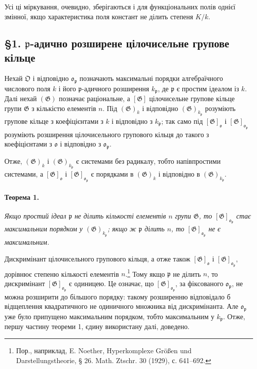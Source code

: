\documentclass[11pt]{article}
\providecommand{\frakO}{\mathfrak{O}}
\providecommand{\frako}{\mathfrak{o}}
\providecommand{\frakp}{\mathfrak{p}}
\providecommand{\Gg}{\mathfrak{G}}
\begin{document}
Усі ці міркування, очевидно, зберігаються і для функціональних полів однієї змінної, якщо характеристика поля констант не ділить степеня \(K/k\).

\subsection*{§1. \(\frakp\)-адично розширене цілочисельне групове кільце}

Нехай \(\frakO\) і відповідно \(\frako_\frakp\) позначають максимальні порядки алгебраїчного числового поля \(k\) і його \(\frakp\)-адичного розширення \(k_\frakp\), де \(\frakp\) є простим ідеалом із \(k\). Далі нехай \((\Gg)\) позначає раціональне, а \([\Gg]\) цілочисельне групове кільце групи \(\Gg\) з кількістю елементів \(n\). Під \((\Gg)_k\) і відповідно \((\Gg)_{k_\frakp}\) розуміють групове кільце з коефіцієнтами з \(k\) і відповідно з \(k_\frakp\); так само під \([\Gg]_\frako\) і \([\Gg]_{\frako_\frakp}\) розуміють розширення цілочисельного групового кільця до такого з коефіцієнтами з \(\frako\) і відповідно з \(\frako_\frakp\).

Отже, \((\Gg)_k\) і \((\Gg)_{k_\frakp}\) є системами без радикалу, тобто напівпростими системами, а \([\Gg]_\frako\) і \([\Gg]_{\frako_\frakp}\) є порядками в \((\Gg)_k\) і відповідно в \((\Gg)_{k_\frakp}\).

\paragraph{Теорема 1.}
\emph{Якщо простий ідеал \(\frakp\) не ділить кількості елементів \(n\) групи \(\Gg\), то \([\Gg]_{\frako_\frakp}\) стає максимальним порядком у \((\Gg)_{k_\frakp}\); якщо ж \(\frakp\) ділить \(n\), то \([\Gg]_{\frako_\frakp}\) не є максимальним.}

Дискримінант цілочисельного групового кільця, а отже також \([\Gg]_\frako\) і \([\Gg]_{\frako_\frakp}\), дорівнює степеню кількості елементів \(n\).\footnote{Пор., наприклад, E. Noether, Hyperkomplexe Größen und Darstellungstheorie, § 26. Math. Ztschr. 30 (1929), с. 641--692.} Тому якщо \(\frakp\) не ділить \(n\), то дискримінант \([\Gg]_{\frako_\frakp}\) є одиницею. Це означає, що \([\Gg]_{\frako_\frakp}\), за фіксованого \(\frako_\frakp\), не можна розширити до більшого порядку: такому розширенню відповідало б відщеплення квадратичного не одиничного множника від дискримінанта. Але \(\frako_\frakp\) уже було припущено максимальним порядком, тобто максимальним у \(k_\frakp\). Отже, першу частину теореми 1, єдину використану далі, доведено.
\end{document}
